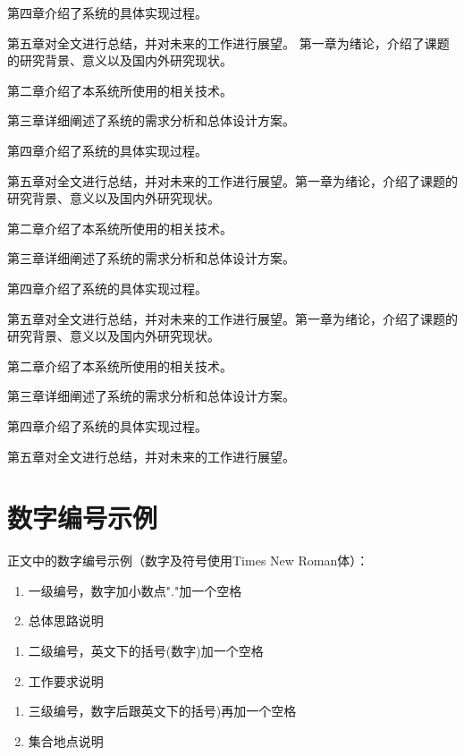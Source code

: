 \documentclass[a4paper,12pt,openany,twoside]{ctexbook}
\begin{document}
第四章介绍了系统的具体实现过程。

第五章对全文进行总结，并对未来的工作进行展望。
第一章为绪论，介绍了课题的研究背景、意义以及国内外研究现状。

第二章介绍了本系统所使用的相关技术。

第三章详细阐述了系统的需求分析和总体设计方案。

第四章介绍了系统的具体实现过程。

第五章对全文进行总结，并对未来的工作进行展望。第一章为绪论，介绍了课题的研究背景、意义以及国内外研究现状。

第二章介绍了本系统所使用的相关技术。

第三章详细阐述了系统的需求分析和总体设计方案。

第四章介绍了系统的具体实现过程。

第五章对全文进行总结，并对未来的工作进行展望。第一章为绪论，介绍了课题的研究背景、意义以及国内外研究现状。

第二章介绍了本系统所使用的相关技术。

第三章详细阐述了系统的需求分析和总体设计方案。

第四章介绍了系统的具体实现过程。

第五章对全文进行总结，并对未来的工作进行展望。

\section{数字编号示例}

正文中的数字编号示例（数字及符号使用Times New Roman体）：

\begin{enumerate}[label=\arabic*.,leftmargin=2em,itemsep=0pt]
    \item 一级编号，数字加小数点"."加一个空格
    \item 总体思路说明
\end{enumerate}

\begin{enumerate}[label=(\arabic*),leftmargin=2.5em,itemsep=0pt]
    \item 二级编号，英文下的括号(数字)加一个空格
    \item 工作要求说明
\end{enumerate}

\begin{enumerate}[label=\arabic*),leftmargin=2.5em,itemsep=0pt]
    \item 三级编号，数字后跟英文下的括号)再加一个空格
    \item 集合地点说明
\end{enumerate}
\end{document}
